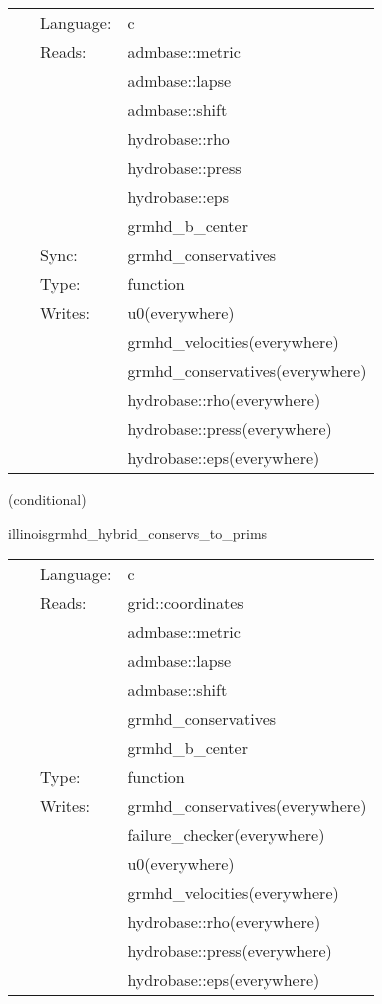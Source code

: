 \documentclass{article}
\begin{document}
 \begin{tabular*}{160mm}{cll} 
~ & Language:  & c \\ 
~ & Reads:  & admbase::metric \\ 
~& ~ &admbase::lapse\\ 
~& ~ &admbase::shift\\ 
~& ~ &hydrobase::rho\\ 
~& ~ &hydrobase::press\\ 
~& ~ &hydrobase::eps\\ 
~& ~ &grmhd\_b\_center\\ 
~ & Sync:  & grmhd\_conservatives \\ 
~ & Type:  & function \\ 
~ & Writes:  & u0(everywhere) \\ 
~& ~ &grmhd\_velocities(everywhere)\\ 
~& ~ &grmhd\_conservatives(everywhere)\\ 
~& ~ &hydrobase::rho(everywhere)\\ 
~& ~ &hydrobase::press(everywhere)\\ 
~& ~ &hydrobase::eps(everywhere)\\ 
\end{tabular*} 


\vspace{5mm}

   (conditional) 

\hspace{5mm} illinoisgrmhd\_hybrid\_conservs\_to\_prims 

\hspace{5mm}{\it hybrid version of illinoisgrmhd\_conservs\_to\_prims } 


\hspace{5mm}

 \begin{tabular*}{160mm}{cll} 
~ & Language:  & c \\ 
~ & Reads:  & grid::coordinates \\ 
~& ~ &admbase::metric\\ 
~& ~ &admbase::lapse\\ 
~& ~ &admbase::shift\\ 
~& ~ &grmhd\_conservatives\\ 
~& ~ &grmhd\_b\_center\\ 
~ & Type:  & function \\ 
~ & Writes:  & grmhd\_conservatives(everywhere) \\ 
~& ~ &failure\_checker(everywhere)\\ 
~& ~ &u0(everywhere)\\ 
~& ~ &grmhd\_velocities(everywhere)\\ 
~& ~ &hydrobase::rho(everywhere)\\ 
~& ~ &hydrobase::press(everywhere)\\ 
~& ~ &hydrobase::eps(everywhere)\\ 
\end{tabular*} 
\end{document}
